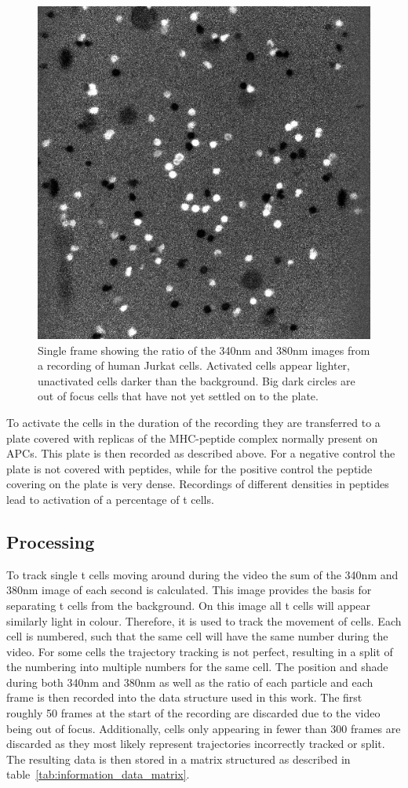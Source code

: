 \begin{figure}
	\centering
	\includegraphics[width=0.6\linewidth]{fig/frame_ratio.jpg}
	\caption{Single frame showing the ratio of the 340nm and 380nm images from a recording of human Jurkat cells. Activated cells appear lighter, unactivated cells darker than the background. Big dark circles are out of focus cells that have not yet settled on to the plate.}
	\label{fig:example_ratio_img}
\end{figure}

To activate the cells in the duration of the recording they are transferred to a plate covered with replicas of the MHC-peptide complex normally present on APCs. This plate is then recorded as described above. For a negative control the plate is not covered with peptides, while for the positive control the peptide covering on the plate is very dense. Recordings of different densities in peptides lead to activation of a percentage of t cells.

\subsection{Processing}

To track single t cells moving around during the video the sum of the 340nm and 380nm image of each second is calculated. This image provides the basis for separating t cells from the background. On this image all t cells will appear similarly light in colour. Therefore, it is used to track the movement of cells. Each cell is numbered, such that the same cell will have the same number during the video. For some cells the trajectory tracking is not perfect, resulting in a split of the numbering into multiple numbers for the same cell. The position and shade during both 340nm and 380nm as well as the ratio of each particle and each frame is then recorded into the data structure used in this work. The first roughly 50 frames at the start of the recording are discarded due to the video being out of focus. Additionally, cells only appearing in fewer than 300 frames are discarded as they most likely represent trajectories incorrectly tracked or split. The resulting data is then stored in a matrix structured as described in table~\ref{tab:information_data_matrix}.

